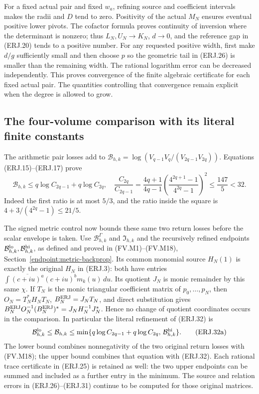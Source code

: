 For a fixed actual pair and fixed $w_a$, refining source and coefficient
intervals makes the radii and $D$ tend to zero. Positivity of the
actual $M_N$ ensures eventual positive lower pivots. The cofactor
formula proves continuity of inversion where the determinant is
nonzero; thus $L_N,U_N\to K_N$, $d\to0$, and the reference gap
in (ERJ.20) tends to a positive number. For any requested positive
width, first make $d/g$ sufficiently small and then choose $p$ so
the geometric tail in (ERJ.26) is smaller than the remaining width.
The rational logarithm error can be decreased independently. This
proves convergence of the finite algebraic certificate for each fixed
actual pair. The quantities controlling that convergence remain
explicit when the degree is allowed to grow.

\subsection{The four-volume comparison with its literal finite constants}
The arithmetic pair losses add to
$\mathcal B_{h,k}=\log(V_{q-1}V_q/(V_{2q-1}V_{2q}))$.
Equations (ERJ.15)--(ERJ.17) prove
\[
 \mathcal B_{h,k}\le q\log C_{2q-1}+q\log C_{2q},\quad
 \frac{C_{2q}}{C_{2q-1}}
 =\frac{4q+1}{4q-1}
 \left(\frac{4^{2q+1}-1}{4^{2q}-1}\right)^2
 \le\frac{147}{5}<32.\tag{ERJ.32}
\]
Indeed the first ratio is at most $5/3$, and the ratio inside
the square is $4+3/(4^{2q}-1)\le21/5$.

The signed metric control now bounds these same two return losses before
the scalar envelope is taken. Use $\mathcal B^\Gamma_{h,k}$ and
$\mathfrak I_{h,k}$ and the recursively refined endpoints $\mathcal B_{h,k}^{\rm lo},\mathcal B_{h,k}^{\rm hi}$, as defined and proved in
(FV.M1)--(FV.M18), Section~\ref{endpoint:metric-backprop}. Its common
monomial source $H_N(1)$ is exactly the original $H_N$ in (ERJ.3): both
have entries $\int\overline{(c+iu)^a}(c+iu)^bm_k(u)\,du$.
Its quotient $J_N$ is monic remainder by this same $\chi$. If $T_N$
is the monic triangular coefficient matrix of $p_0,\ldots,p_N$, then
$O_N=T_N^*H_NT_N$, $B_N^{\rm ERJ}=J_NT_N$, and direct substitution
gives $B_N^{\rm ERJ}O_N^{-1}(B_N^{\rm ERJ})^*=J_NH_N^{-1}J_N^*$.
Hence no change of quotient coordinates occurs in the comparison.
In particular the literal refinement of (ERJ.32) is
\[
 \mathcal B_{h,k}^{\rm lo}
 \le\mathcal B_{h,k}\le
 \min\{q\log C_{2q-1}+q\log C_{2q},\,
                   \mathcal B_{h,k}^{\rm hi}\}.
 \tag{ERJ.32a}\label{erj:metric-budget}
\]
The lower bound combines nonnegativity of the two original return losses
with (FV.M18); the upper bound combines that equation with (ERJ.32).
Each rational trace certificate in (ERJ.25) is retained as well: the two
upper endpoints can be summed and included as a further entry in the
minimum. The source and relation errors in (ERJ.26)--(ERJ.31) continue
to be computed for those original matrices.

